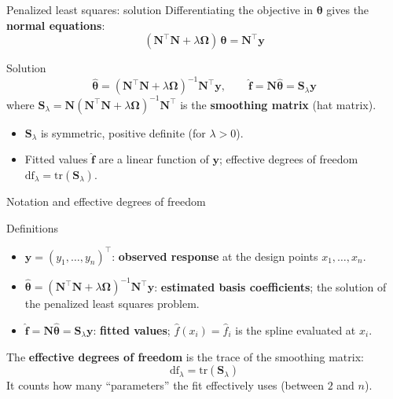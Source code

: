\documentclass[aspectratio=169]{beamer}
\begin{document}
\begin{frame}{Penalized least squares: solution}
Differentiating the objective in $\boldsymbol{\theta}$ gives the \textbf{normal equations}:
\[
(\mathbf{N}^\top \mathbf{N} + \lambda \boldsymbol{\Omega}) \, \boldsymbol{\theta} = \mathbf{N}^\top \mathbf{y}
\]

\begin{block}{Solution}
\[
\hat{\boldsymbol{\theta}} = (\mathbf{N}^\top \mathbf{N} + \lambda \boldsymbol{\Omega})^{-1} \mathbf{N}^\top \mathbf{y}, \qquad
\hat{\mathbf{f}} = \mathbf{N} \hat{\boldsymbol{\theta}} = \mathbf{S}_\lambda \mathbf{y}
\]
where $\mathbf{S}_\lambda = \mathbf{N}(\mathbf{N}^\top \mathbf{N} + \lambda \boldsymbol{\Omega})^{-1} \mathbf{N}^\top$ is the \textbf{smoothing matrix} (hat matrix).
\end{block}

\begin{itemize}
    \item $\mathbf{S}_\lambda$ is symmetric, positive definite (for $\lambda > 0$).
    \item Fitted values $\hat{\mathbf{f}}$ are a linear function of $\mathbf{y}$; effective degrees of freedom $\text{df}_\lambda = \text{tr}(\mathbf{S}_\lambda)$.
\end{itemize}
\end{frame}

\begin{frame}{Notation and effective degrees of freedom}
\begin{block}{Definitions}
\begin{itemize}
    \item $\mathbf{y} = (y_1, \ldots, y_n)^\top$: \textbf{observed response} at the design points $x_1, \ldots, x_n$.
    \item $\hat{\boldsymbol{\theta}} = (\mathbf{N}^\top \mathbf{N} + \lambda \boldsymbol{\Omega})^{-1} \mathbf{N}^\top \mathbf{y}$: \textbf{estimated basis coefficients}; the solution of the penalized least squares problem.
    \item $\hat{\mathbf{f}} = \mathbf{N} \hat{\boldsymbol{\theta}} = \mathbf{S}_\lambda \mathbf{y}$: \textbf{fitted values}; $\hat{f}(x_i) = \hat{f}_i$ is the spline evaluated at $x_i$.
\end{itemize}
\end{block}

The \textbf{effective degrees of freedom} is the trace of the smoothing matrix:
\[
\text{df}_\lambda = \text{tr}(\mathbf{S}_\lambda)
\]
It counts how many “parameters” the fit effectively uses (between $2$ and $n$).
\end{frame}
\end{document}
